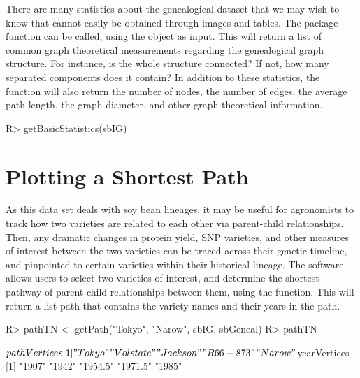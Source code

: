 \documentclass[article,shortnames]{jss}
\begin{document}
There are many statistics about the  genealogical dataset that we may wish to know that cannot easily be obtained through images and tables. The package function  can be called, using the  object as input. This will return a list of common graph theoretical measurements regarding the genealogical graph structure. For instance, is the whole structure connected? If not, how many separated components does it contain? In addition to these statistics, the  function will also return the number of nodes, the number of edges, the average path length, the graph diameter, and other graph theoretical information.

\begin{CodeChunk}
\begin{CodeInput}
R> getBasicStatistics(sbIG)
\end{CodeInput}
\end{CodeChunk}

\section{Plotting a Shortest Path}

As this data set deals with soy bean lineages, it may be useful for agronomists to track how two varieties are related to each other via parent-child relationships. Then, any dramatic changes in protein yield, SNP varieties, and other measures of interest between the two varieties can be traced across their genetic timeline, and pinpointed to certain varieties within their historical lineage. The  software allows users to select two varieties of interest, and determine the shortest pathway of parent-child relationships between them, using the  function. This will return a list path that contains the variety names and their years in the path.

\begin{CodeChunk}
\begin{CodeInput}
R> pathTN <- getPath("Tokyo", "Narow", sbIG, sbGeneal)
R> pathTN
\end{CodeInput}
\begin{CodeOutput}
$pathVertices
[1] "Tokyo"    "Volstate" "Jackson"  "R66-873"  "Narow"   

$yearVertices
[1] "1907"   "1942"   "1954.5" "1971.5" "1985" 
\end{CodeOutput}
\end{CodeChunk}
\end{document}
